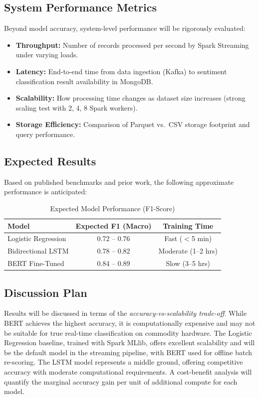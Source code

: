 \documentclass[conference]{IEEEtran}
\begin{document}
\subsection{System Performance Metrics}
Beyond model accuracy, system-level performance will be rigorously evaluated:
\begin{itemize}[leftmargin=*]
    \item \textbf{Throughput:} Number of records processed per second by Spark Streaming under varying loads.
    \item \textbf{Latency:} End-to-end time from data ingestion (Kafka) to sentiment classification result availability in MongoDB.
    \item \textbf{Scalability:} How processing time changes as dataset size increases (strong scaling test with 2, 4, 8 Spark workers).
    \item \textbf{Storage Efficiency:} Comparison of Parquet vs.\ CSV storage footprint and query performance.
\end{itemize}

\subsection{Expected Results}
Based on published benchmarks and prior work, the following approximate performance is anticipated:

\begin{table}[H]
\centering
\caption{Expected Model Performance (F1-Score)}
\label{tab:expected}
\renewcommand{\arraystretch}{1.15}
\begin{tabular}{@{}lcc@{}}
\toprule
\textbf{Model} & \textbf{Expected F1 (Macro)} & \textbf{Training Time} \\
\midrule
Logistic Regression & 0.72 -- 0.76 & Fast ($<$5 min) \\
Bidirectional LSTM & 0.78 -- 0.82 & Moderate (1--2 hrs) \\
BERT Fine-Tuned & 0.84 -- 0.89 & Slow (3--5 hrs) \\
\bottomrule
\end{tabular}
\end{table}

\subsection{Discussion Plan}
Results will be discussed in terms of the \textit{accuracy-vs-scalability trade-off}. While BERT achieves the highest accuracy, it is computationally expensive and may not be suitable for true real-time classification on commodity hardware. The Logistic Regression baseline, trained with Spark MLlib, offers excellent scalability and will be the default model in the streaming pipeline, with BERT used for offline batch re-scoring. The LSTM model represents a middle ground, offering competitive accuracy with moderate computational requirements. A cost-benefit analysis will quantify the marginal accuracy gain per unit of additional compute for each model.
\end{document}
